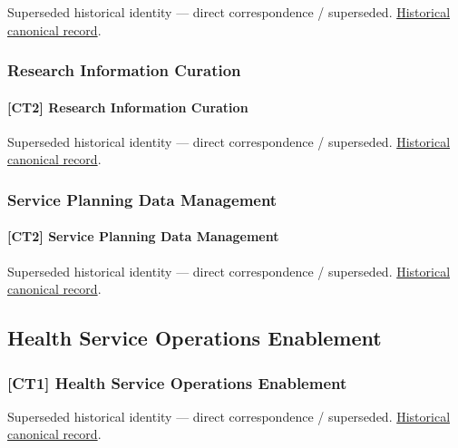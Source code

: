 \par\label{element:ced472b2d1a54016878ee541de969d9b}
Superseded historical identity — direct correspondence / superseded. \href{../../../../continuum/strategy/capability/ced472b2d1a54016878ee541de969d9b.md}{Historical canonical record}.\par

\subsubsection{Research Information Curation}

\paragraph{[CT2] Research Information Curation}

\par\label{element:11203b9c80964a9b96883eeab07f41d5}
Superseded historical identity — direct correspondence / superseded. \href{../../../../continuum/strategy/capability/11203b9c80964a9b96883eeab07f41d5.md}{Historical canonical record}.\par

\subsubsection{Service Planning Data Management}

\paragraph{[CT2] Service Planning Data Management}

\par\label{element:19263e0802cc4b88af7a345f1410cffd}
Superseded historical identity — direct correspondence / superseded. \href{../../../../continuum/strategy/capability/19263e0802cc4b88af7a345f1410cffd.md}{Historical canonical record}.\par

\subsection{Health Service Operations Enablement}

\subsubsection{[CT1] Health Service Operations Enablement}

\par\label{element:a98424298dac46d8b2ddd109d928270a}
Superseded historical identity — direct correspondence / superseded. \href{../../../../continuum/strategy/capability/a98424298dac46d8b2ddd109d928270a.md}{Historical canonical record}.\par

